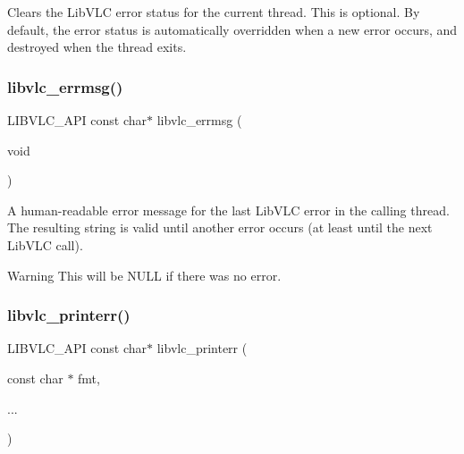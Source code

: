 Clears the Lib\+V\+LC error status for the current thread. This is optional. By default, the error status is automatically overridden when a new error occurs, and destroyed when the thread exits. \mbox{\label{group__libvlc__error_ga659961a8e857b904a6a9f249e550b2b1}} 
\subsubsection{\texorpdfstring{libvlc\+\_\+errmsg()}{libvlc\_errmsg()}}
{\footnotesize\ttfamily L\+I\+B\+V\+L\+C\+\_\+\+A\+PI const char$\ast$ libvlc\+\_\+errmsg (\begin{DoxyParamCaption}\item[{void}]{ }\end{DoxyParamCaption})}

A human-\/readable error message for the last Lib\+V\+LC error in the calling thread. The resulting string is valid until another error occurs (at least until the next Lib\+V\+LC call).

\begin{DoxyWarning}{Warning}
This will be N\+U\+LL if there was no error. 
\end{DoxyWarning}
\mbox{\label{group__libvlc__error_gaf3a4bb86d2cca57f0e22651f8d65696a}} 
\subsubsection{\texorpdfstring{libvlc\+\_\+printerr()}{libvlc\_printerr()}}
{\footnotesize\ttfamily L\+I\+B\+V\+L\+C\+\_\+\+A\+PI const char$\ast$ libvlc\+\_\+printerr (\begin{DoxyParamCaption}\item[{const char $\ast$}]{fmt,  }\item[{}]{... }\end{DoxyParamCaption})}

